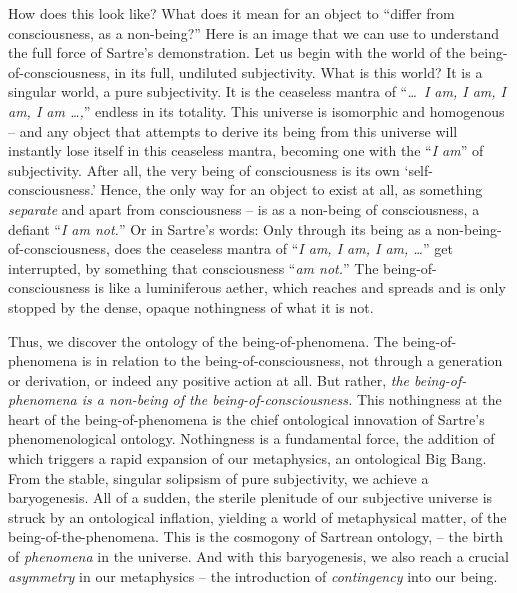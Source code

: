 \noindent
How does this look like? What does it mean for an object to \enquote{differ from consciousness, as a non-being?} Here is an image that we can use to understand the full force of Sartre's demonstration. Let us begin with the world of the being-of-consciousness, in its full, undiluted subjectivity. What is this world? It is a singular world, a pure subjectivity. It is the ceaseless mantra of \enquote{\emph{\ldots\ I am, I am, I am, I am \ldots,}} endless in its totality. This universe is isomorphic and homogenous -- and any object that attempts to derive its being from this universe will instantly lose itself in this ceaseless mantra, becoming one with the \enquote{\emph{I am}} of subjectivity. After all, the very being of consciousness is its own \enquote*{self-consciousness.} Hence, the only way for an object to exist at all, as something \emph{separate} and apart from consciousness -- is as a non-being of consciousness, a defiant \enquote{\emph{I am not.}} Or in Sartre's words:  Only through its being as a non-being-of-consciousness, does the ceaseless mantra of \enquote{\emph{I am, I am, I am, \ldots}} get interrupted, by something that consciousness \enquote{\emph{am not.}} The being-of-consciousness is like a luminiferous aether, which reaches and spreads and is only stopped by the dense, opaque nothingness of what it is not. 

Thus, we discover the ontology of the being-of-phenomena. The being-of-phenomena is in relation to the being-of-consciousness, not through a generation or derivation, or indeed any positive action at all. But rather, \emph{the being-of-phenomena is a non-being of the being-of-consciousness.} This nothingness at the heart of the being-of-phenomena is the chief ontological innovation of Sartre's phenomenological ontology. Nothingness is a fundamental force, the addition of which triggers a rapid expansion of our metaphysics, an ontological Big Bang. From the stable, singular solipsism of pure subjectivity, we achieve a baryogenesis. All of a sudden, the sterile plenitude of our subjective universe is struck by an ontological inflation, yielding a world of metaphysical matter, of the being-of-the-phenomena. This is the cosmogony of Sartrean ontology, -- the birth of \emph{phenomena} in the universe. And with this baryogenesis, we also reach a crucial \emph{asymmetry} in our metaphysics -- the introduction of \emph{contingency} into our being.

